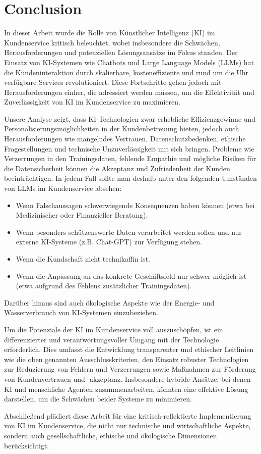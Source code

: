 \documentclass[12pt]{article}
\begin{document}
\section{Conclusion}
In dieser Arbeit wurde die Rolle von Künstlicher Intelligenz (KI) im Kundenservice kritisch beleuchtet, wobei insbesondere die Schwächen, Herausforderungen und potenziellen Lösungsansätze im Fokus standen. Der Einsatz von KI-Systemen wie Chatbots und Large Language Models (LLMs) hat die Kundeninteraktion durch skalierbare, kosteneffiziente und rund um die Uhr verfügbare Services revolutioniert. Diese Fortschritte gehen jedoch mit Herausforderungen einher, die adressiert werden müssen, um die Effektivität und Zuverlässigkeit von KI im Kundenservice zu maximieren.

Unsere Analyse zeigt, dass KI-Technologien zwar erhebliche Effizienzgewinne und Personalisierungsmöglichkeiten in der Kundenbetreuung bieten, jedoch auch Herausforderungen wie mangelndes Vertrauen, Datenschutzbedenken, ethische Fragestellungen und technische Unzuverlässigkeit mit sich bringen. Probleme wie Verzerrungen in den Trainingsdaten, fehlende Empathie und mögliche Risiken für die Datensicherheit können die Akzeptanz und Zufriedenheit der Kunden beeinträchtigen.
In jedem Fall sollte man deshalb unter den folgenden Umständen von LLMs im Kundenservice absehen:
\begin{itemize}
    \item Wenn Falschaussagen schwerwiegende Konsequenzen haben können (etwa bei Medizinischer oder Finanzieller Beratung).
    \item Wenn besonders schützenswerte Daten verarbeitet werden sollen und nur externe KI-Systeme (z.B. Chat-GPT) zur Verfügung stehen.
    \item Wenn die Kundschaft nicht technikaffin ist.
    \item Wenn die Anpassung an das konkrete Geschäftsfeld nur schwer möglich ist (etwa aufgrund des Fehlens zusätzlicher Trainingsdaten).
\end{itemize}
Darüber hinaus sind auch ökologische Aspekte wie der Energie- und Wasserverbrauch von KI-Systemen einzubeziehen.

Um die Potenziale der KI im Kundenservice voll auszuschöpfen, ist ein differenzierter und verantwortungsvoller Umgang mit der Technologie erforderlich. Dies umfasst die Entwicklung transparenter und ethischer Leitlinien wie die oben genannten Ausschlusskriterien, den Einsatz robuster Technologien zur Reduzierung von Fehlern und Verzerrungen sowie Maßnahmen zur Förderung von Kundenvertrauen und -akzeptanz. 
Insbesondere hybride Ansätze, bei denen KI und menschliche Agenten zusammenarbeiten, könnten eine effektive Lösung darstellen, um die Schwächen beider Systeme zu minimieren.

Abschließend plädiert diese Arbeit für eine kritisch-reflektierte Implementierung von KI im Kundenservice, die nicht nur technische und wirtschaftliche Aspekte, sondern auch gesellschaftliche, ethische und ökologische Dimensionen berücksichtigt.



\end{document}
